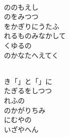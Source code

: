 \documentclass[10pt,b5j]{tarticle} %
\begin{document}
\begin{enumerate}
\begin{minipage}[c]{\blocksize}
    \end{minipage}
    \begin{minipage}[c]{\blocksize}
        
        \vspace{\linespace}
        \item~\\
        ののもえし\\
        のをみつつ\\
        をかぎりにうたふ\\
        れるものみなかして\\
        くゆるの\\
        のかなたへえてく
        
    \end{minipage}
    \begin{minipage}[c]{\blocksize}
        
        \vspace{\linespace}
        \item~\\
        き「」と「」に\\
        たぎるをしつつ\\
        れふの\\
        のかがりちみ\\
        にむやの\\
        いざやへん
    
    \end{minipage}
\end{enumerate} %
\end{document}
